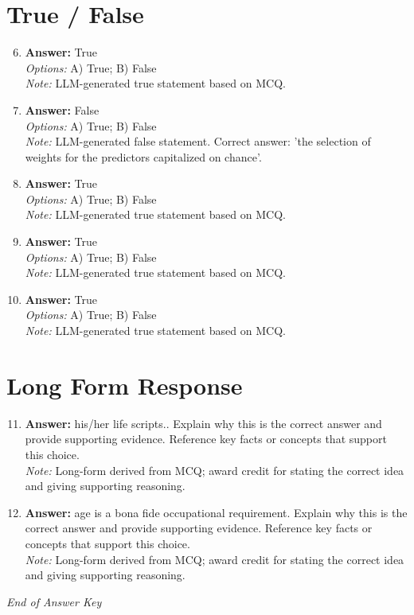 \documentclass[12pt]{article}
\begin{document}
\section*{True / False}
\begin{enumerate}[label=\arabic*.]
\setcounter{enumi}{5}
\item \textbf{Answer:} True
\\ \textit{Options:} A) True; B) False
\\ \textit{Note:} LLM-generated true statement based on MCQ.
\item \textbf{Answer:} False
\\ \textit{Options:} A) True; B) False
\\ \textit{Note:} LLM-generated false statement. Correct answer: 'the selection of weights for the predictors capitalized on chance'.
\item \textbf{Answer:} True
\\ \textit{Options:} A) True; B) False
\\ \textit{Note:} LLM-generated true statement based on MCQ.
\item \textbf{Answer:} True
\\ \textit{Options:} A) True; B) False
\\ \textit{Note:} LLM-generated true statement based on MCQ.
\item \textbf{Answer:} True
\\ \textit{Options:} A) True; B) False
\\ \textit{Note:} LLM-generated true statement based on MCQ.
\end{enumerate}

\section*{Long Form Response}
\begin{enumerate}[label=\arabic*.]
\setcounter{enumi}{10}
\item \textbf{Answer:} his/her life scripts.. Explain why this is the correct answer and provide supporting evidence. Reference key facts or concepts that support this choice.
\\ \textit{Note:} Long-form derived from MCQ; award credit for stating the correct idea and giving supporting reasoning.
\item \textbf{Answer:} age is a bona fide occupational requirement. Explain why this is the correct answer and provide supporting evidence. Reference key facts or concepts that support this choice.
\\ \textit{Note:} Long-form derived from MCQ; award credit for stating the correct idea and giving supporting reasoning.
\end{enumerate}

\vfill
\noindent\textit{End of Answer Key}
\end{document}
